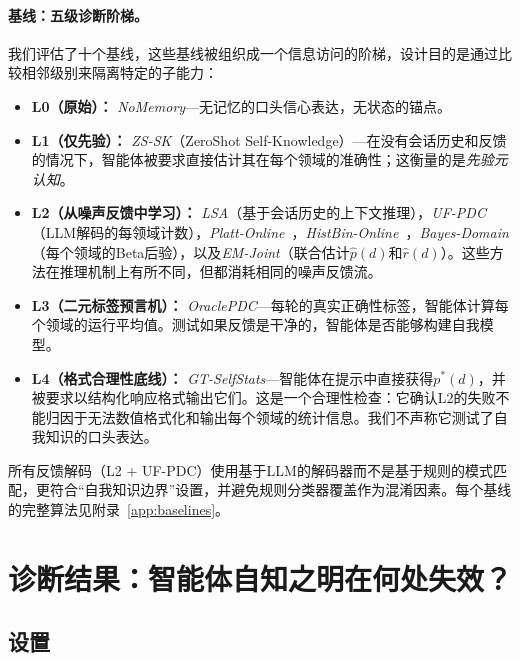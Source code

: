 \documentclass[11pt,a4paper,fontset=fandol]{ctexart}
\begin{document}
\paragraph{基线：五级诊断阶梯。} 我们评估了十个基线，这些基线被组织成一个信息访问的阶梯，设计目的是通过比较相邻级别来隔离特定的子能力：
\begin{itemize}[nosep,leftmargin=1.4em]
  \item \textbf{L0（原始）：} \emph{NoMemory}---无记忆的口头信心表达，无状态的锚点。
  \item \textbf{L1（仅先验）：} \emph{ZS-SK}（ZeroShot Self-Knowledge）---在没有会话历史和反馈的情况下，智能体被要求直接估计其在每个领域的准确性；这衡量的是\emph{先验元认知}。
  \item \textbf{L2（从噪声反馈中学习）：} \emph{LSA}（基于会话历史的上下文推理），\emph{UF-PDC}（LLM解码的每领域计数），\emph{Platt-Online}~\citep{platt1999probabilistic}，\emph{HistBin-Online}~\citep{zadrozny2001obtaining}，\emph{Bayes-Domain}（每个领域的Beta后验），以及\emph{EM-Joint}（联合估计$\hat{p}(d)$和$\hat{r}(d)$）。这些方法在推理机制上有所不同，但都消耗相同的噪声反馈流。
  \item \textbf{L3（二元标签预言机）：} \emph{OraclePDC}---每轮的真实正确性标签，智能体计算每个领域的运行平均值。测试如果反馈是干净的，智能体是否能够构建自我模型。
  \item \textbf{L4（格式合理性底线）：} \emph{GT-SelfStats}---智能体在提示中直接获得$p^*(d)$，并被要求以结构化响应格式输出它们。这是一个合理性检查：它确认L2的失败不能归因于无法数值格式化和输出每个领域的统计信息。我们不声称它测试了自我知识的口头表达。
\end{itemize}
所有反馈解码（L2 + UF-PDC）使用基于LLM的解码器而不是基于规则的模式匹配，更符合“自我知识边界”设置，并避免规则分类器覆盖作为混淆因素。每个基线的完整算法见附录~\ref{app:baselines}。


\section{诊断结果：智能体自知之明在何处失效？}
\label{sec:experiments}

\subsection{设置}
\label{sec:setup}
\end{document}

